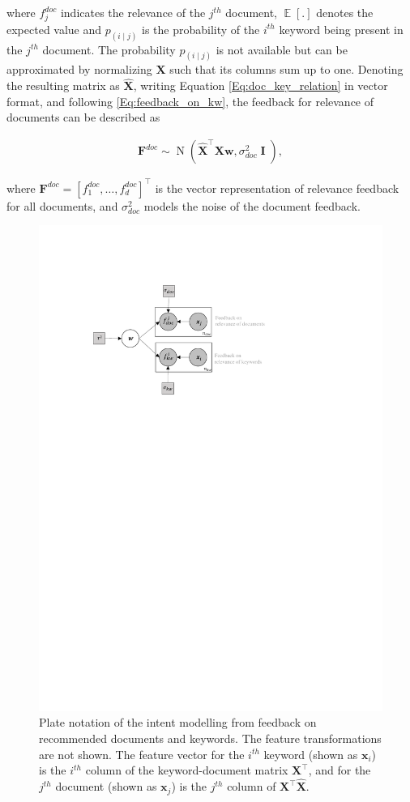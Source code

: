 \documentclass[dissertation,math,vertlayout,pdfa,colorlinks]{aaltoseries}
\newcommand{\bw}{\bm{w}}
\DeclareMathOperator{\eye}{\textbf{I}}
\DeclareMathOperator{\normalpdf}{N}
\DeclareMathOperator{\E}{\mathbb{E}}
\newcommand{\tp}{^{\top}}
\begin{document}
\noindent where $f_{j}^{doc}$ indicates the relevance of the $j^{th}$ document, $\E[.]$ denotes the expected value and $p_{(i \mid j)}$ is the probability of the $i^{th}$ keyword being present in the $j^{th}$ document. The probability $p_{(i \mid j)}$ is not available but can be approximated by normalizing $\bm{X}$ such that its columns sum up to one. Denoting the resulting matrix as $\hat{\bm{X}}$, writing Equation \ref{Eq:doc_key_relation} in vector format, and following  \ref{Eq:feedback_on_kw}, the feedback for relevance of documents can be described as 

\begin{align}\label{Eq:doc_key_relation_vector} 
\bm{F}^{doc} \sim \normalpdf(  \hat{\bm{X}}\tp \bm{X} \bw, \sigma_{doc}^2 \eye),
\end{align}  

\noindent where $\bm{F}^{doc}=[f_{1}^{doc},\ldots,f_{d}^{doc}]\tp$ is the vector representation of relevance feedback for all documents, and $\sigma_{doc}^2$ models the noise of the document feedback. 

\begin{figure}
	\centering
	\includegraphics[width=0.80\linewidth]{Figures/Plate_diagram_intent_kd.pdf}
	\caption{Plate notation of the intent modelling from feedback on recommended documents and keywords. The feature transformations are not shown. The feature vector for the $i^{th}$ keyword (shown as $\bm{x}_i$) is the $i^{th}$ column of the keyword-document matrix $\bm{X}\tp$, and for the $j^{th}$ document (shown as $\bm{x}_j$) is the $j^{th}$ column of $\bm{X}\tp\hat{\bm{X}}$.}
	\label{fig:Plate_intent_kd}
\end{figure}
\end{document}
